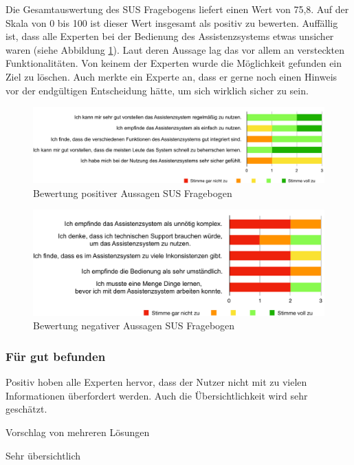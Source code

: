 Die Gesamtauswertung des SUS Fragebogens liefert einen Wert von 75,8. Auf der Skala von 0 bis 100 ist dieser Wert insgesamt als positiv zu bewerten.  Auffällig ist, dass alle Experten bei der Bedienung des Assistenzsystems etwas unsicher waren (siehe Abbildung \ref{pic:SUS-positiv}). Laut deren Aussage lag das vor allem an versteckten Funktionalitäten. Von keinem der Experten wurde die Möglichkeit gefunden ein Ziel zu löschen. Auch merkte ein Experte an, dass er gerne noch einen Hinweis vor der endgültigen Entscheidung hätte, um sich wirklich sicher zu sein.

\begin{figure}[htb]
\centering
\includegraphics[scale=0.55]{DA_files/Bilder/Validierung/Bild-positive_Aussagen.pdf}
\caption{Bewertung positiver Aussagen SUS Fragebogen}
\label{pic:SUS-positiv}
\end{figure}

\begin{figure}[htb]
\centering
\includegraphics[scale=0.65]{DA_files/Bilder/Validierung/Bild-negative_Aussagen.pdf}
\caption{Bewertung negativer Aussagen SUS Fragebogen}
\label{pic:SUS-negativ}
\end{figure}

\subsubsection*{Für gut befunden}
Positiv hoben alle Experten hervor, dass der Nutzer nicht mit zu vielen Informationen überfordert werden. Auch die Übersichtlichkeit wird sehr geschätzt. 

Vorschlag von mehreren Lösungen

Sehr übersichtlich


